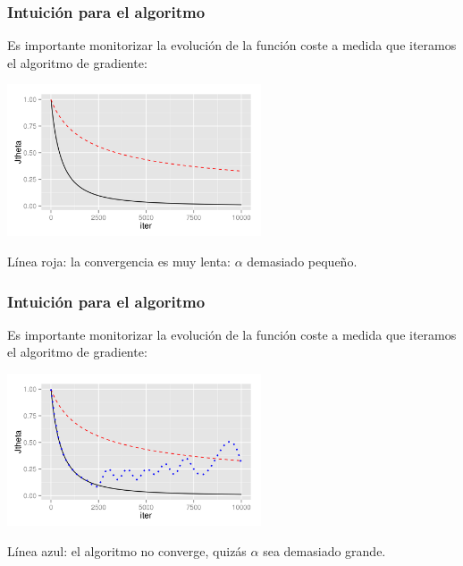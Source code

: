 \documentclass[aspectratio=169]{beamer}
\begin{document}
\begin{frame}
 \frametitle{Intuición para el algoritmo}
 \begin{overlayarea}{\textwidth}{8cm}
Es importante monitorizar la evolución de la función coste a medida que iteramos el algoritmo de gradiente:
\begin{center}
  \includegraphics[height=4.5cm]{Jiter-2.png}
\end{center}
{\scriptsize Línea roja: la convergencia es muy lenta: $\alpha$ demasiado pequeño.}
 \end{overlayarea}
\end{frame}

\begin{frame}
 \frametitle{Intuición para el algoritmo}
 \begin{overlayarea}{\textwidth}{8cm}
Es importante monitorizar la evolución de la función coste a medida que iteramos el algoritmo de gradiente:
\begin{center}
  \includegraphics[height=4.5cm]{Jiter-3.png}
\end{center}
{\scriptsize Línea azul: el algoritmo no converge,  quizás $\alpha$ sea demasiado grande.}
 \end{overlayarea}
\end{frame}
\end{document}
